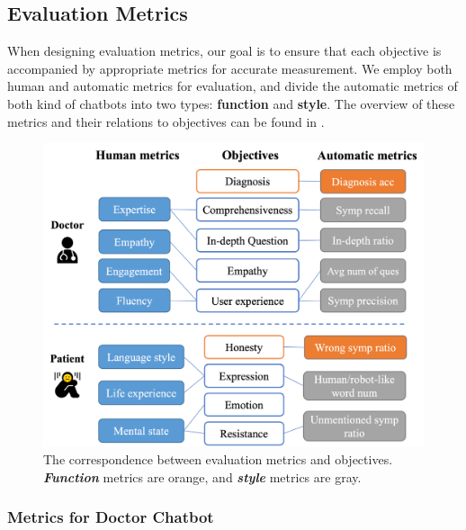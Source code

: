 \subsection{Evaluation Metrics}
\label{sec:eval_metric}
When designing evaluation metrics, our goal is to ensure that each objective is accompanied by appropriate metrics for accurate measurement.  We employ both human and automatic metrics for evaluation, and divide the automatic metrics of both kind of chatbots into two types: \textbf{function} and \textbf{style}. The overview of these metrics and their relations to objectives can be found in .
\begin{figure}[th]
	\centering
	\includegraphics[width=\linewidth]{Figures/metrics.png}
	\caption{The correspondence between evaluation metrics and objectives. \textbf{\textit{Function}} metrics are orange, and \textbf{\textit{style}} metrics are gray.}
	\label{fig:all_metric}
\end{figure}

\subsubsection{Metrics for Doctor Chatbot}
\label{sec:doc_metric}
